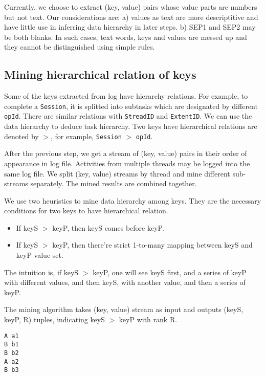 Currently, we choose to extract (key, value) pairs whose
value parts are numbers but not text. Our considerations
are: a) values as text are more descriptitive and have
little use in inferring data hierarchy in later steps. b)
SEP1 and SEP2 may be both blanks. In such cases,
text words, keys and values are messed up and they cannot be
distinguished using simple rules.


\subsection{Mining hierarchical relation of keys}

Some of the keys extracted from log have hierarchy
relations. For example, to complete a \texttt{Session}, it
is splitted into subtasks which are designated by different
\texttt{opId}. There are similar relations with
\texttt{StreadID} and \texttt{ExtentID}. We can use the
data hierarchy to deduce task hierarchy. Two keys have
hierarchical relations are denoted by $>$, for example,
\texttt{Session} $>$ \texttt{opId}.

After the previous step, we get a stream of (key, value)
pairs in their order of appearance in log file. Activities
from multiple threads may be logged into the same log file.
We split (key, value) streams by thread and mine different
sub-streams separately. The mined results are combined
together.

We use two heuristics to mine data hierarchy among keys.
They are the necessary conditions for two keys to have
hierarchical relation.
\begin{itemize}
\item If keyS $>$ keyP, then keyS comes before keyP.
\item If keyS $>$ keyP, then there're strict 1-to-many
mapping between keyS and keyP value set.
\end{itemize}
The intuition is, if keyS $>$ keyP, one will see keyS first,
and a series of keyP with different values, and then keyS,
with another value, and then a series of keyP. 

The mining algorithm takes (key, value) stream as input and
outputs (keyS, keyP, R) tuples, indicating keyS $>$ keyP
with rank R.

\begin{verbatim}
A a1
B b1
B b2
A a2
B b3
\end{verbatim}

